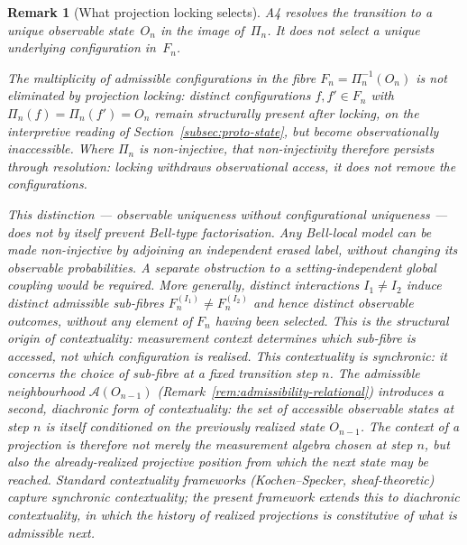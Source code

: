 \documentclass[11pt,a4paper]{article}
\newtheorem{remark}[theorem]{Remark}
\begin{document}
  \begin{remark}[What projection locking selects]
    \label{rem:a4-selects}
    A4 resolves the transition to a unique observable state~$O_n$ in the image of~$\Pi_n$.
    It does not select a unique underlying configuration in~$F_n$.

    The multiplicity of admissible configurations in the fibre $F_n = \Pi_n^{-1}(O_n)$ is
    not eliminated by projection locking: distinct configurations $f, f' \in F_n$ with
    $\Pi_n(f) = \Pi_n(f') = O_n$ remain structurally present after locking, on the interpretive reading of
    Section~\ref{subsec:proto-state}, but become observationally inaccessible.
    Where $\Pi_n$ is non-injective, that non-injectivity therefore persists through resolution:
    locking withdraws observational access, it does not remove the configurations.

    This distinction --- observable uniqueness without configurational uniqueness --- does not
    by itself prevent Bell-type factorisation.
    Any Bell-local model can be made non-injective by adjoining an independent erased label,
    without changing its observable probabilities.
    A separate obstruction to a setting-independent global coupling would be required.
    More generally, distinct interactions $I_1 \neq I_2$ induce distinct admissible
    sub-fibres $F_n^{(I_1)} \neq F_n^{(I_2)}$ and hence distinct observable outcomes,
    without any element of $F_n$ having been selected.
    This is the structural origin of contextuality: measurement context determines
    which sub-fibre is accessed, not which configuration is realised.
    This contextuality is \emph{synchronic}: it concerns the choice of sub-fibre at a
    fixed transition step $n$.
    The admissible neighbourhood $\mathcal{A}(O_{n-1})$ (Remark~\ref{rem:admissibility-relational})
    introduces a second, \emph{diachronic} form of contextuality: the set of accessible
    observable states at step $n$ is itself conditioned on the previously realized state
    $O_{n-1}$.
    The context of a projection is therefore not merely the measurement algebra chosen at
    step $n$, but also the already-realized projective position from which the next state
    may be reached.
    Standard contextuality frameworks (Kochen--Specker, sheaf-theoretic) capture synchronic
    contextuality; the present framework extends this to diachronic contextuality, in which
    the history of realized projections is constitutive of what is admissible next.
  \end{remark}
\end{document}
